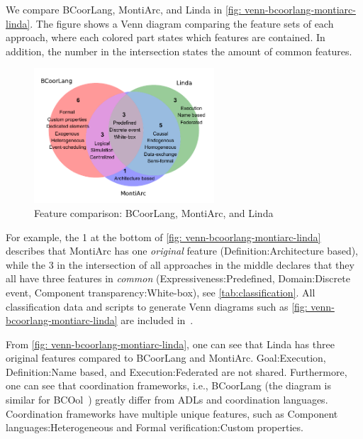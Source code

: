 \documentclass[runningheads]{llncs}
\begin{document}
We compare BCoorLang, MontiArc, and Linda in \autoref{fig: venn-bcoorlang-montiarc-linda}.
The figure shows a Venn diagram comparing the feature sets of each approach, where each colored part states which features are contained.
In addition, the number in the intersection states the amount of common features.

\begin{figure}[ht]
	\centering
	\includegraphics[width=0.6\textwidth]{images/venn_bcoorlang_montiarc_linda}
	\caption{Feature comparison: BCoorLang, MontiArc, and Linda}
	\label{fig: venn-bcoorlang-montiarc-linda}
\end{figure}

For example, the \textsf{1} at the bottom of \autoref{fig: venn-bcoorlang-montiarc-linda} describes that MontiArc has one \textit{original} feature (\textsf{Definition:Architecture based}), while the \textsf{3} in the intersection of all approaches in the middle declares that they all have three features in \textit{common} (\textsf{Expressiveness:Predefined, Domain:Discrete event, Component transparency:White-box}), see \autoref{tab:classification}.
All classification data and scripts to generate Venn diagrams such as \autoref{fig: venn-bcoorlang-montiarc-linda} are included in~\cite{timkrauterArtifactsCoordination2024}.

From \autoref{fig: venn-bcoorlang-montiarc-linda}, one can see that Linda has three original features compared to BCoorLang and MontiArc.
\textsf{Goal:Execution}, \textsf{Definition:Name based}, and \textsf{Execution:Federated} are not shared.
Furthermore, one can see that coordination frameworks, i.e., BCoorLang (the diagram is similar for BCOol~\cite{varalarsenBehavioralCoordinationOperator2015,varalarsenBCOolBehavioralCoordination2016}) greatly differ from ADLs and coordination languages.
Coordination frameworks have multiple unique features, such as \textsf{Component languages:Heterogeneous} and \textsf{Formal verification:Custom properties}.
\end{document}
